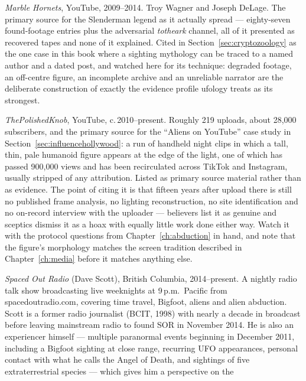 \begin{list}{}{\setlength{\leftmargin}{1.2em}\setlength{\itemindent}{-1.2em}
\setlength{\itemsep}{3pt}}
\item \emph{Marble Hornets}, YouTube, 2009--2014. Troy Wagner and Joseph DeLage. The primary source
for the Slenderman legend as it actually spread --- eighty-seven found-footage entries plus the
adversarial \emph{totheark} channel, all of it presented as recovered tapes and none of it
explained. Cited in Section~\ref{sec:cryptozoology} as the one case in this book where a sighting
mythology can be traced to a named author and a dated post, and watched here for its technique:
degraded footage, an off-centre figure, an incomplete archive and an unreliable narrator are the
deliberate construction of exactly the evidence profile ufology treats as its strongest.
\item \emph{ThePolishedKnob}, YouTube, c.\,2010--present. Roughly 219 uploads, about 28{,}000
subscribers, and the primary source for the ``Aliens on YouTube'' case study in
Section~\ref{sec:influencehollywood}: a run of handheld night clips in which a tall, thin, pale
humanoid figure appears at the edge of the light, one of which has passed 900{,}000 views and has been
recirculated across TikTok and Instagram, usually stripped of any attribution. Listed as primary
source material rather than as evidence. The point of citing it is that fifteen years after upload
there is still no published frame analysis, no lighting reconstruction, no site identification and no
on-record interview with the uploader --- believers list it as genuine and sceptics dismiss it as a
hoax with equally little work done either way. Watch it with the protocol questions from
Chapter~\ref{ch:abduction} in hand, and note that the figure's morphology matches the screen tradition
described in Chapter~\ref{ch:media} before it matches anything else.
\item \emph{Spaced Out Radio} (Dave Scott), British Columbia, 2014--present. A nightly radio talk show
broadcasting live weeknights at 9\,p.m.\ Pacific from spacedoutradio.com, covering time travel,
Bigfoot, aliens and alien abduction. Scott is a former radio journalist (BCIT, 1998) with nearly
a decade in broadcast before leaving mainstream radio to found SOR in November 2014. He is also an
experiencer himself --- multiple paranormal events beginning in December 2011, including a Bigfoot
sighting at close range, recurring UFO appearances, personal contact with what he calls the Angel
of Death, and sightings of five extraterrestrial species --- which gives him a perspective on the

\end{list}
